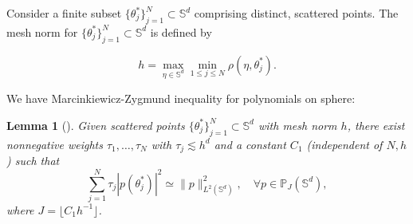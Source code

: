 \documentclass{article}
\numberwithin{equation}{section}
\newtheorem{lemma}{Lemma}
\def\SS{\mathbb{S}}
\def\mal{\max\limits}
\begin{document}
Consider a finite subset $\{\theta_j^*\}_{j=1}^N\subset \mathbb{S}^{d}$ comprising distinct, scattered points. The mesh norm for $\{\theta_j^*\}_{j=1}^N\subset \mathbb{S}^{d}$ is defined by

\begin{equation}
h=\mal_{\eta\in\SS^d}\min\limits_{1\leq j\leq N}\rho(\eta,\theta_j^*).
\end{equation}

We have Marcinkiewicz-Zygmund inequality for polynomials on sphere: 
\begin{lemma}[{\cite[Theorem 3.1]{mhaskar2001spherical}}]\label{lem:MZ-inequ}
    Given scattered points $\{\theta_j^*\}_{j=1}^N \subset \SS^d$ with mesh norm $h$, there exist nonnegative weights $\tau_1,\dots,\tau_N$ with $\tau_j\lesssim h^d$ and a constant $C_1$ (independent of $N, h$) such that
    \begin{equation}\label{eqn:MZ-inequ}
        \sum_{j=1}^N\tau_j|p(\theta_j^*)|^2 \simeq \|p\|_{L^2(\SS^d)}^2, \quad \forall p\in\mathbb{P}_{J}(\SS^d),
    \end{equation}
    where $J=\lfloor C_1h^{-1}\rfloor$.
\end{lemma}
\end{document}
